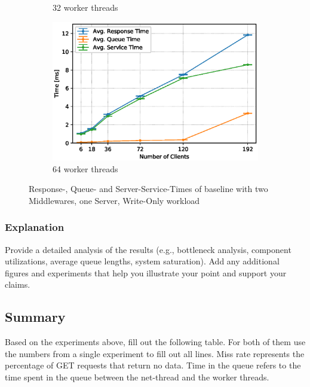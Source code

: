 \documentclass[11pt,a4paper]{article}
\begin{document}
\begin{figure}
\begin{subfigure}{.5\textwidth}
        \caption{32 worker threads}
    \end{subfigure}
    \begin{subfigure}{.5\textwidth}
        \includegraphics[width=1\linewidth]{plots/3_2b_extendedLatencyMiddleware_64w.eps}
        \caption{64 worker threads}
    \end{subfigure}

    \caption{Response-, Queue- and Server-Service-Times of baseline with two Middlewares, one Server, Write-Only workload}
    \label{fig:3-2-times-readonly}
\end{figure}

\subsubsection{Explanation}

Provide a detailed analysis of the results (e.g., bottleneck analysis, component utilizations, average queue lengths, system saturation). Add any additional figures and experiments that help you illustrate your point and support your claims.

\subsection{Summary}

Based on the experiments above, fill out the following table. For both of them use the numbers from a single experiment to fill out all lines. Miss rate represents the percentage of GET requests that return no data. Time in the queue refers to the time spent in the queue between the net-thread and the worker threads.
\end{document}
